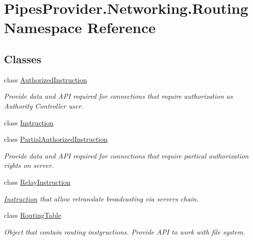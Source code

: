 \hypertarget{namespace_pipes_provider_1_1_networking_1_1_routing}{}\section{Pipes\+Provider.\+Networking.\+Routing Namespace Reference}
\label{namespace_pipes_provider_1_1_networking_1_1_routing}
\subsection*{Classes}
\begin{DoxyCompactItemize}
\item 
class \mbox{\hyperlink{class_pipes_provider_1_1_networking_1_1_routing_1_1_authorized_instruction}{Authorized\+Instruction}}
\begin{DoxyCompactList}\small\item\em Provide data and A\+PI required for connections that require authorization as Authority Controller user. \end{DoxyCompactList}\item 
class \mbox{\hyperlink{class_pipes_provider_1_1_networking_1_1_routing_1_1_instruction}{Instruction}}
\item 
class \mbox{\hyperlink{class_pipes_provider_1_1_networking_1_1_routing_1_1_partial_authorized_instruction}{Partial\+Authorized\+Instruction}}
\begin{DoxyCompactList}\small\item\em Provide data and A\+PI required for connections that require partical authorization rights on server. \end{DoxyCompactList}\item 
class \mbox{\hyperlink{class_pipes_provider_1_1_networking_1_1_routing_1_1_relay_instruction}{Relay\+Instruction}}
\begin{DoxyCompactList}\small\item\em \mbox{\hyperlink{class_pipes_provider_1_1_networking_1_1_routing_1_1_instruction}{Instruction}} that allow retranslate broadcasting via servers chain. \end{DoxyCompactList}\item 
class \mbox{\hyperlink{class_pipes_provider_1_1_networking_1_1_routing_1_1_routing_table}{Routing\+Table}}
\begin{DoxyCompactList}\small\item\em Object that contain routing instgructions. Provide A\+PI to work with file system. \end{DoxyCompactList}\end{DoxyCompactItemize}
